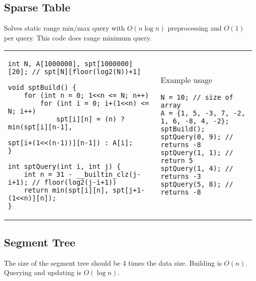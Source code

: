 \documentclass[letterpaper]{article}
\begin{document}
\subsection{Sparse Table}

Solves static range min/max query with $O\left(n\log n\right)$ preprocessing and $O\left(1\right)$ per query. This code does range minimum query.

\begin{tabular}{@{}p{12cm}p{6cm}@{}}
\vspace*{-1em}
\begin{lstlisting}
int N, A[1000000], spt[1000000][20]; // spt[N][floor(log2(N))+1]

void sptBuild() {
	for (int n = 0; 1<<n <= N; n++)
		for (int i = 0; i+(1<<n) <= N; i++)
			spt[i][n] = (n) ? min(spt[i][n-1],
			                      spt[i+(1<<(n-1))][n-1]) : A[i];
}

int sptQuery(int i, int j) {
	int n = 31 - __builtin_clz(j-i+1); // floor(log2(j-i+1))
	return min(spt[i][n], spt[j+1-(1<<n)][n]);
}
\end{lstlisting}
&
Example usage
\begin{lstlisting}
N = 10; // size of array
A = {1, 5, -3, 7, -2, 1, 6, -8, 4, -2};
sptBuild();
sptQuery(0, 9); // returns -8
sptQuery(1, 1); // return 5
sptQuery(1, 4); // returns -3
sptQuery(5, 8); // returns -8
\end{lstlisting}
\end{tabular}

\clearpage

\subsection{Segment Tree}

The size of the segment tree should be 4 times the data size. Building is $O\left(n\right)$. Querying and updating is $O\left(\log n\right)$.
\end{document}
